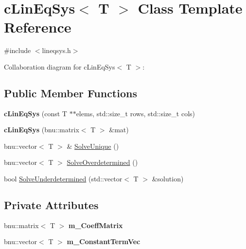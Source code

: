\hypertarget{classcLinEqSys}{\section{c\-Lin\-Eq\-Sys$<$ T $>$ Class Template Reference}
\label{classcLinEqSys}
}


{\ttfamily \#include $<$lineqsys.\-h$>$}



Collaboration diagram for c\-Lin\-Eq\-Sys$<$ T $>$\-:
\subsection*{Public Member Functions}
\begin{DoxyCompactItemize}
\item 
\hypertarget{classcLinEqSys_ab80e0ee1bf57383bd6b04c8e5878eeed}{{\bfseries c\-Lin\-Eq\-Sys} (const T $\ast$$\ast$elems, std\-::size\-\_\-t rows, std\-::size\-\_\-t cols)}\label{classcLinEqSys_ab80e0ee1bf57383bd6b04c8e5878eeed}

\item 
\hypertarget{classcLinEqSys_aee02a711deb23dfd1ce69bfaa06bd257}{{\bfseries c\-Lin\-Eq\-Sys} (bnu\-::matrix$<$ T $>$ \&mat)}\label{classcLinEqSys_aee02a711deb23dfd1ce69bfaa06bd257}

\item 
bnu\-::vector$<$ T $>$ \& \hyperlink{classcLinEqSys_a39978bcfd4366712d09e7eb54bb09cef}{Solve\-Unique} ()
\item 
bnu\-::vector$<$ T $>$ \hyperlink{classcLinEqSys_ad3d9edcf200c3256220054f5ee0fdaeb}{Solve\-Overdetermined} ()
\item 
bool \hyperlink{classcLinEqSys_a7144d697d601517aead8642f5956a9b0}{Solve\-Underdetermined} (std\-::vector$<$ T $>$ \&solution)
\end{DoxyCompactItemize}
\subsection*{Private Attributes}
\begin{DoxyCompactItemize}
\item 
\hypertarget{classcLinEqSys_ac270e6753af6ee64fb101b2f487ea492}{bnu\-::matrix$<$ T $>$ {\bfseries m\-\_\-\-Coeff\-Matrix}}\label{classcLinEqSys_ac270e6753af6ee64fb101b2f487ea492}

\item 
\hypertarget{classcLinEqSys_ae6d53e781615a0819bc144adb2f35d77}{bnu\-::vector$<$ T $>$ {\bfseries m\-\_\-\-Constant\-Term\-Vec}}\label{classcLinEqSys_ae6d53e781615a0819bc144adb2f35d77}

\end{DoxyCompactItemize}


